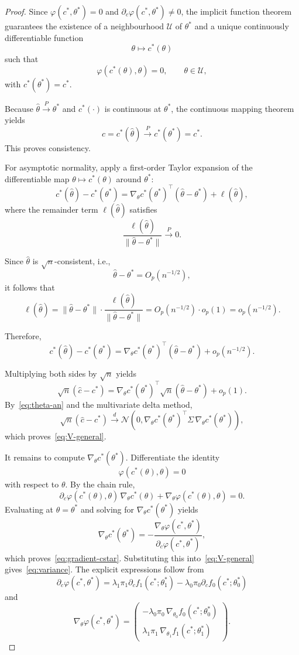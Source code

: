 \documentclass[11pt,a4paper]{article}
\theoremstyle{definition}
\theoremstyle{remark}
\newcommand{\1}{\mathbf{1}}
\begin{document}
\begin{proof}
Since $\varphi(c^*,\theta^*)=0$ and $\partial_c\varphi(c^*,\theta^*)\neq 0$, the implicit function theorem guarantees the existence of a neighbourhood $\mathcal U$ of $\theta^*$ and a unique continuously differentiable function
\[
\theta\mapsto c^*(\theta)
\]
such that
\[
\varphi(c^*(\theta),\theta)=0,
\qquad
\theta\in\mathcal U,
\]
with $c^*(\theta^*)=c^*$.

\noindent
Because $\hat\theta\xrightarrow{P}\theta^*$ and $c^*(\cdot)$ is continuous at $\theta^*$, the continuous mapping theorem yields
\[
\hat c=c^*(\hat\theta)\xrightarrow{P}c^*(\theta^*)=c^*.
\]
This proves consistency.

For asymptotic normality, apply a first-order Taylor expansion of the differentiable map $\theta \mapsto c^*(\theta)$ around $\theta^*$:
\[
c^*(\hat\theta)-c^*(\theta^*)
=
\nabla_\theta c^*(\theta^*)^\top(\hat\theta-\theta^*)
+
\ell (\hat\theta),
\]
where the remainder term $\ell(\hat\theta)$ satisfies
\[
\frac{\ell(\hat\theta)}{\|\hat\theta-\theta^*\|} \xrightarrow{P} 0.
\]

\noindent
Since $\hat\theta$ is $\sqrt{n}$-consistent, i.e.,
\[
\hat\theta - \theta^* = O_p(n^{-1/2}),
\]
it follows that
\[
\ell(\hat\theta)
=
\|\hat\theta-\theta^*\|
\cdot
\frac{\ell(\hat\theta)}{\|\hat\theta-\theta^*\|}
=
O_p(n^{-1/2}) \cdot o_p(1)
=
o_p(n^{-1/2}).
\]

\noindent
Therefore,
\[
c^*(\hat\theta)-c^*(\theta^*)
=
\nabla_\theta c^*(\theta^*)^\top(\hat\theta-\theta^*)
+
o_p(n^{-1/2}).
\]

\noindent
Multiplying both sides by $\sqrt{n}$ yields
\[
\sqrt{n}(\hat c-c^*)
=
\nabla_\theta c^*(\theta^*)^\top \sqrt{n}(\hat\theta-\theta^*)
+
o_p(1).
\]
By~\eqref{eq:theta-an} and the multivariate delta method,
\[
\sqrt n(\hat c-c^*)
\stackrel{d}{\longrightarrow}
\mathcal N\!\left(
0,
\nabla_\theta c^*(\theta^*)^\top\Sigma\,\nabla_\theta c^*(\theta^*)
\right),
\]
which proves~\eqref{eq:V-general}.

\noindent
It remains to compute $\nabla_\theta c^*(\theta^*)$. Differentiate the identity
\[
\varphi(c^*(\theta),\theta)=0
\]
with respect to $\theta$. By the chain rule,
\[
\partial_c\varphi(c^*(\theta),\theta)\,\nabla_\theta c^*(\theta)
+
\nabla_\theta\varphi(c^*(\theta),\theta)
=
0.
\]
Evaluating at $\theta=\theta^*$ and solving for $\nabla_\theta c^*(\theta^*)$ yields
\[
\nabla_\theta c^*(\theta^*)
= -\frac{\nabla_\theta\varphi(c^*,\theta^*)}{\partial_c\varphi(c^*,\theta^*)},\]
which proves~\eqref{eq:gradient-cstar}. Substituting this into~\eqref{eq:V-general} gives~\eqref{eq:variance}. The explicit expressions follow from
\[
\partial_c\varphi(c^*,\theta^*)
=
\lambda_1\pi_1 \partial_c f_1(c^*;\theta_1^*)-\lambda_0\pi_0 \partial_c f_0(c^*;\theta_0^*)
\]
and
\[
\nabla_\theta\varphi(c^*,\theta^*)
=
\begin{pmatrix}
-\lambda_0\pi_0\,\nabla_{\theta_0}f_0(c^*;\theta_0^*)\\[0.4em]
\lambda_1\pi_1\,\nabla_{\theta_1}f_1(c^*;\theta_1^*)
\end{pmatrix}.
\]
\end{proof}
\end{document}
